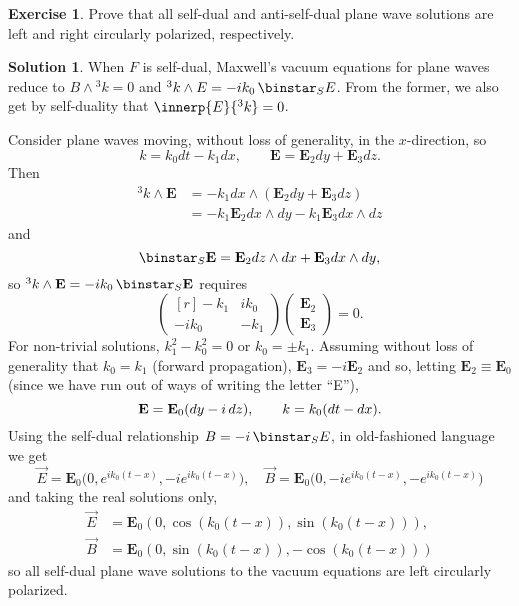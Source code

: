 \documentclass[11pt, a4paper]{report}
\theoremstyle{definition}
\newtheorem{exercise}{Exercise}[part]
\newtheorem{solution}{Solution}[part]
\newenvironment{ex}{\begin{exercise}}{\end{exercise}\pagebreak[1]}
\newenvironment{sol}{\begin{solution}}{\end{solution}\pagebreak[3]}
\newcommand*{\op}[1]{\ensuremath\mathop{}\mathopen{}#1}
\renewcommand*{\d}{\op{d}}
\renewcommand*{\star}{\op{\binstar}\mathord{}}
\begin{document}
\begin{ex}

Prove that all self-dual and anti-self-dual plane wave solutions are left and right circularly polarized, respectively.

\end{ex}

\begin{sol}

When $F$ is self-dual, Maxwell's vacuum equations for plane waves reduce to $B \wedge {}^3 k = 0$ and $^3 k \wedge E = -ik_0 \star_S E$. From the former, we also get by self-duality that $\innerp{E}{{}^3 k} = 0$.

Consider plane waves moving, without loss of generality, in the $x$-direction, so
\[
    k = k_0 dt - k_1 dx, \qquad
    \mathbf{E} = \mathbf{E}_2 dy + \mathbf{E}_3 dz.
\]
Then
\begin{align*}
    ^3 k \wedge \mathbf{E} &= -k_1 dx \wedge (\mathbf{E}_2 dy + \mathbf{E}_3 dz) \\
        &= -k_1 \mathbf{E}_2 dx \wedge dy - k_1 \mathbf{E}_3 dx \wedge dz
\end{align*}
and
\[
    \star_S \mathbf{E} = \mathbf{E}_2 dz \wedge dx + \mathbf{E}_3 dx \wedge dy,
\]
so $^3 k \wedge \mathbf{E} = -ik_0 \star_S \mathbf{E}$ requires
\[
    \begin{pmatrix*}[r]
        -k_1  & ik_0 \\
        -ik_0 & -k_1
    \end{pmatrix*}
    \begin{pmatrix}
        \mathbf{E}_2 \\ \mathbf{E}_3
    \end{pmatrix}
    = 0.
\]
For non-trivial solutions, $k_1^2 - k_0^2 = 0$ or $k_0 = \pm k_1$.
Assuming without loss of generality that $k_0 = k_1$ (forward propagation), $\mathbf{E}_3 = -i \mathbf{E}_2$ and so, letting $\mathbf{E}_2 \equiv \mathbf{E}_0$ (since we have run out of ways of writing the letter ``E''),
\[
    \mathbf{E} = \mathbf{E}_0 (dy -i \d z), \qquad
    k = k_0 (dt - dx).
\]
Using the self-dual relationship $B = -i \star_S E$, in old-fashioned language we get
\[
    \vec{E} = \mathbf{E}_0 \bigl( 0, e^{ik_0 (t - x)}, -ie^{ik_0 (t - x)} \bigr), \quad
    \vec{B} = \mathbf{E}_0 \bigl( 0, -ie^{ik_0 (t - x)}, -e^{ik_0 (t - x)} \bigr)
\]
and taking the real solutions only,
\begin{align*}
    \vec{E} &= \mathbf{E}_0 (0, \cos(k_0 (t - x)), \sin(k_0 (t - x))), \\
    \vec{B} &= \mathbf{E}_0 (0, \sin(k_0 (t - x)), -\cos(k_0 (t - x)))
\end{align*}
so all self-dual plane wave solutions to the vacuum equations are left circularly polarized.


\end{sol}
\end{document}
